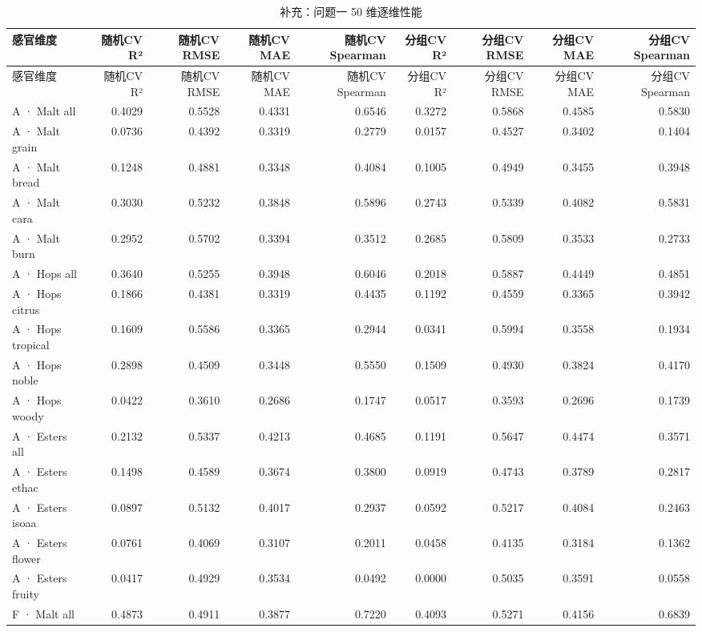 {\footnotesize
\setlength{\tabcolsep}{3.5pt}
\begin{longtable}{lrrrrrrrr}
\caption{补充：问题一 50 维逐维性能}
\label{tab:s01_q1_per_target}\\
\toprule
感官维度 & 随机CV R² & 随机CV RMSE & 随机CV MAE & 随机CV Spearman & 分组CV R² & 分组CV RMSE & 分组CV MAE & 分组CV Spearman \\
\midrule
\endfirsthead
\toprule
感官维度 & 随机CV R² & 随机CV RMSE & 随机CV MAE & 随机CV Spearman & 分组CV R² & 分组CV RMSE & 分组CV MAE & 分组CV Spearman \\
\midrule
\endhead
\bottomrule
\endlastfoot
A · Malt all & 0.4029 & 0.5528 & 0.4331 & 0.6546 & 0.3272 & 0.5868 & 0.4585 & 0.5830 \\
A · Malt grain & 0.0736 & 0.4392 & 0.3319 & 0.2779 & 0.0157 & 0.4527 & 0.3402 & 0.1404 \\
A · Malt bread & 0.1248 & 0.4881 & 0.3348 & 0.4084 & 0.1005 & 0.4949 & 0.3455 & 0.3948 \\
A · Malt cara & 0.3030 & 0.5232 & 0.3848 & 0.5896 & 0.2743 & 0.5339 & 0.4082 & 0.5831 \\
A · Malt burn & 0.2952 & 0.5702 & 0.3394 & 0.3512 & 0.2685 & 0.5809 & 0.3533 & 0.2733 \\
A · Hops all & 0.3640 & 0.5255 & 0.3948 & 0.6046 & 0.2018 & 0.5887 & 0.4449 & 0.4851 \\
A · Hops citrus & 0.1866 & 0.4381 & 0.3319 & 0.4435 & 0.1192 & 0.4559 & 0.3365 & 0.3942 \\
A · Hops tropical & 0.1609 & 0.5586 & 0.3365 & 0.2944 & 0.0341 & 0.5994 & 0.3558 & 0.1934 \\
A · Hops noble & 0.2898 & 0.4509 & 0.3448 & 0.5550 & 0.1509 & 0.4930 & 0.3824 & 0.4170 \\
A · Hops woody & 0.0422 & 0.3610 & 0.2686 & 0.1747 & 0.0517 & 0.3593 & 0.2696 & 0.1739 \\
A · Esters all & 0.2132 & 0.5337 & 0.4213 & 0.4685 & 0.1191 & 0.5647 & 0.4474 & 0.3571 \\
A · Esters ethac & 0.1498 & 0.4589 & 0.3674 & 0.3800 & 0.0919 & 0.4743 & 0.3789 & 0.2817 \\
A · Esters isoaa & 0.0897 & 0.5132 & 0.4017 & 0.2937 & 0.0592 & 0.5217 & 0.4084 & 0.2463 \\
A · Esters flower & 0.0761 & 0.4069 & 0.3107 & 0.2011 & 0.0458 & 0.4135 & 0.3184 & 0.1362 \\
A · Esters fruity & 0.0417 & 0.4929 & 0.3534 & 0.0492 & 0.0000 & 0.5035 & 0.3591 & 0.0558 \\
F · Malt all & 0.4873 & 0.4911 & 0.3877 & 0.7220 & 0.4093 & 0.5271 & 0.4156 & 0.6839 \\

\end{longtable}}
